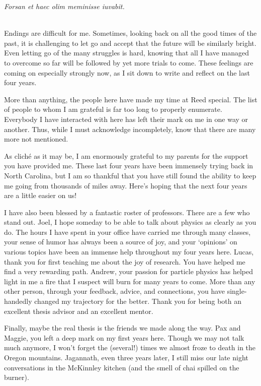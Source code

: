 \documentclass[../thesis.tex]{subfiles}
\begin{document}
	\textit{Forsan et haec olim meminisse iuvabit.}

	\,\\

	\noindent Endings are difficult for me. Sometimes, looking back on all the good times of the past, it is challenging to let go and accept that the future will be similarly bright. Even letting go of the many struggles is hard, knowing that all I have managed to overcome so far will be followed by yet more trials to come. These feelings are coming on especially strongly now, as I sit down to write and reflect on the last four years.

	More than anything, the people here have made my time at Reed special. The list of people to whom I am grateful is far too long to properly enumerate. Everybody I have interacted with here has left their mark on me in one way or another. Thus, while I must acknowledge incompletely, know that there are many more not mentioned.

	As clich\'e as it may be, I am enormously grateful to my parents for the support you have provided me. These last four years have been immensely trying back in North Carolina, but I am so thankful that you have still found the ability to keep me going from thousands of miles away. Here's hoping that the next four years are a little easier on us!

	I have also been blessed by a fantastic roster of professors. There are a few who stand out. Joel, I hope someday to be able to talk about physics as clearly as you do. The hours I have spent in your office have carried me through many classes, your sense of humor has always been a source of joy, and your `opinions' on various topics have been an immense help throughout my four years here. Lucas, thank you for first teaching me about the joy of research. You have helped me find a very rewarding path. Andrew, your passion for particle physics has helped light in me a fire that I suspect will burn for many years to come. More than any other person, through your feedback, advice, and connections, you have single-handedly changed my trajectory for the better. Thank you for being both an excellent thesis advisor and an excellent mentor.

	Finally, maybe the real thesis is the friends we made along the way. Pax and Maggie, you left a deep mark on my first years here. Though we may not talk much anymore, I won't forget the (several!) times we almost froze to death in the Oregon mountains. Jagannath, even three years later, I still miss our late night conversations in the McKinnley kitchen (and the smell of chai spilled on the burner).
\end{document}
